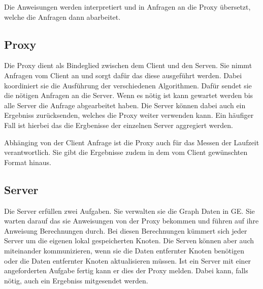 Die Anweisungen werden interpretiert und in Anfragen an die Proxy übersetzt, welche die Anfragen dann abarbeitet.

\subsection{Proxy}

Die Proxy dient als Bindeglied zwischen dem Client und den Serven. Sie nimmt Anfragen vom Client an und sorgt dafür das diese ausgeführt werden.
Dabei koordiniert sie die Ausführung der verschiedenen Algorithmen. Dafür sendet sie die nötigen Anfragen an die Server. Wenn es nötig ist kann gewartet werden 
bis alle Server die Anfrage abgearbeitet haben. Die Server können dabei auch ein Ergebniss zurücksenden, welches die Proxy weiter verwenden kann. Ein häufiger Fall
ist hierbei das die Ergbenisse der einzelnen Server aggregiert werden.

Abhänging von der Client Anfrage ist die Proxy auch für das Messen der Laufzeit verantwortlich. Sie gibt die Ergebnisse zudem in dem vom Client
gewünschten Format hinaus.


\subsection{Server}

Die Server erfüllen zwei Aufgaben. Sie verwalten sie die Graph Daten in GE.
Sie warten darauf das sie Anweisungen von der Proxy bekommen und führen auf ihre Anweisung Berechnungen durch. Bei diesen Berechnungen kümmert sich jeder Server 
um die eigenen lokal gespeicherten Knoten. Die Serven können aber auch miteinander kommunizieren, wenn sie die Daten entfernter Knoten benötigen oder die Daten entfernter Knoten
aktualisieren müssen.
Ist ein Server mit einer angeforderten Aufgabe fertig kann er dies der Proxy melden. Dabei kann, falls nötig, auch ein Ergebniss mitgesendet werden.



